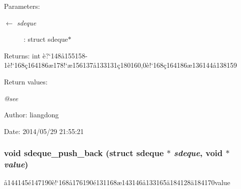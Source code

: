 \begin{Desc}
\item[Parameters:]
\begin{description}
\item[\mbox{$\leftarrow$} {\em sdeque}]: struct sdeque$\ast$ \end{description}
\end{Desc}
\begin{Desc}
\item[Returns:]int \`{e}?`148\aa{}155158-1\`{e}!`168\c{c}164186\ae{}178!`\ae{}156137\aa{}133131\c{c}180160,0\`{e}!`168\c{c}164186\ae{}136144\aa{}138159 \end{Desc}
\begin{Desc}
\item[Return values:]
\begin{description}
\item[{\em @see}]\end{description}
\end{Desc}
\begin{Desc}
\item[Author:]liangdong \end{Desc}
\begin{Desc}
\item[Date:]2014/05/29 21:55:21 \end{Desc}
\subsubsection{\setlength{\rightskip}{0pt plus 5cm}void sdeque\_\-push\_\-back (struct sdeque $\ast$ {\em sdeque}, void $\ast$ {\em value})}\label{sdeque_8h_a5}


\aa{}144145\'{e}147190\`{e}!`168\aa{}176190\'{e}131168\ae{}143146\aa{}133165\"{a}184128\"{a}184170value 

